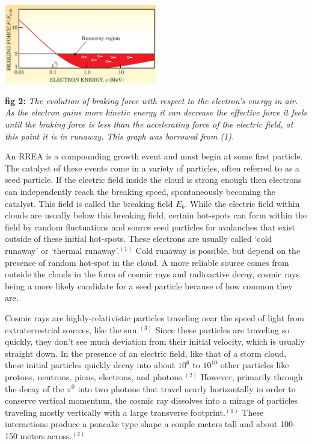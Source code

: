 \documentclass[11pt]{article}
\begin{document}
\begin{multicols*}{2}
    \begin{center}
        \includegraphics[width=0.5\textwidth]{images/Breaking Plot.JPG}
    \end{center}
    \textbf{fig 2:} \textit{The evolution of braking force with respect to the electron's energy in air. As the electron gains more kinetic energy it can decrease the effective force it feels until the braking force is less than the accelerating force of the electric field, at this point it is in runaway. This graph was borrowed from (1).}
    
    An RREA is a compounding growth event and must begin at some first particle. The catalyst of these events come in a variety of particles, often referred to as a seed particle. If the electric field inside the cloud is strong enough then electrons can independently reach the breaking speed, spontaneously becoming the catalyst. This field is called the breaking field $E_b$. While the electric field within clouds are usually below this breaking field, certain hot-spots can form within the field by random fluctuations and source seed particles for avalanches that exist outside of these initial hot-spots. These electrons are usually called `cold runaway' or `thermal runaway'.$^{(1)}$ Cold runaway is possible, but depend on the presence of random hot-spot in the cloud. A more reliable source comes from outside the clouds in the form of cosmic rays and radioactive decay, cosmic rays being a more likely candidate for a seed particle because of how common they are. 
    
    Cosmic rays are highly-relativistic particles traveling near the speed of light from extraterrestrial sources, like the sun.$^{(3)}$ Since these particles are traveling so quickly, they don't see much deviation from their initial velocity, which is usually straight down. In the presence of an electric field, like that of a storm cloud, these initial particles quickly decay into about $10^6$ to $10^{10}$ other particles like protons, neutrons, pions, electrons, and photons.$^{(2)}$ However, primarily through the decay of the $\pi^0$ into two photons that travel nearly horizontally in order to conserve vertical momentum, the cosmic ray dissolves into a mirage of particles traveling mostly vertically with a large transverse footprint.$^{(1)}$  These interactions produce a pancake type shape a couple meters tall and about 100-150 meters across.$^{(2)}$
    

\end{multicols*}
\end{document}
